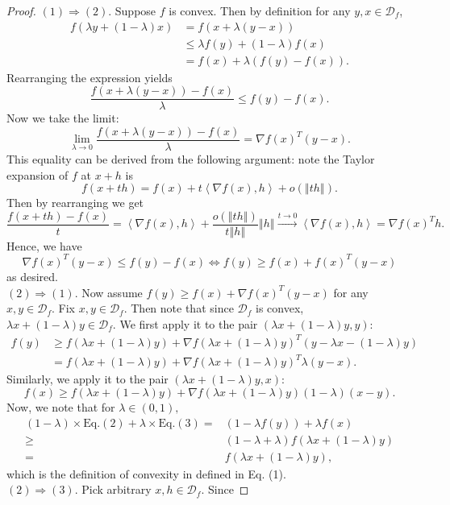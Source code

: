 \begin{proof}
$(1)\Rightarrow(2).$ Suppose $f$ is convex. Then by definition for
any $y,x\in\mathcal{D}_{f}$, 
\begin{align*}
f(\lambda y+(1-\lambda)x) & =f(x+\lambda(y-x))\\
 & \leq\lambda f(y)+(1-\lambda)f(x)\\
 & =f(x)+\lambda(f(y)-f(x)).
\end{align*}
Rearranging the expression yields 
\[
\frac{f(x+\lambda(y-x))-f(x)}{\lambda}\leq f(y)-f(x).
\]
Now we take the limit: 
\[
\lim_{\lambda\rightarrow0}\frac{f(x+\lambda(y-x))-f(x)}{\lambda}=\nabla f(x)^{T}(y-x).
\]
This equality can be derived from the following argument: note the
Taylor expansion of $f$ at $x+h$ is 
\[
f(x+th)=f(x)+t\left\langle \nabla f(x),h\right\rangle +o(\left\Vert th\right\Vert ).
\]
Then by rearranging we get 
\[
\frac{f(x+th)-f(x)}{t}=\left\langle \nabla f(x),h\right\rangle +\frac{o(\left\Vert th\right\Vert )}{t\left\Vert h\right\Vert }\left\Vert h\right\Vert \xrightarrow{t\rightarrow0}\left\langle \nabla f(x),h\right\rangle =\nabla f(x)^{T}h.
\]
Hence, we have 
\[
\nabla f(x)^{T}(y-x)\leq f(y)-f(x)\iff f(y)\geq f(x)+f(x)^{T}(y-x)
\]
as desired. \medskip\\
$(2)\Rightarrow(1)$. Now assume $f(y)\geq f(x)+\nabla f(x)^{T}(y-x)$
for any $x,y\in\mathcal{D}_{f}.$ Fix $x,y\in\mathcal{D}_{f}$. Then
note that since $\mathcal{D}_{f}$ is convex, $\lambda x+(1-\lambda)y\in\mathcal{D}_{f}$.
We first apply it to the pair $(\lambda x+(1-\lambda)y,y)$: 
\begin{align*}
f(y) & \geq f(\lambda x+(1-\lambda)y)+\nabla f(\lambda x+(1-\lambda)y)^{T}(y-\lambda x-(1-\lambda)y)\\
 & =f(\lambda x+(1-\lambda)y)+\nabla f(\lambda x+(1-\lambda)y)^{T}\lambda(y-x).\tag{2}
\end{align*}
Similarly, we apply it to the pair $(\lambda x+(1-\lambda)y,x):$
\[
f(x)\geq f(\lambda x+(1-\lambda)y)+\nabla f(\lambda x+(1-\lambda)y)(1-\lambda)(x-y).\tag{3}
\]
Now, we note that for $\lambda\in(0,1),$ 
\begin{align*}
(1-\lambda)\times\text{Eq.}(2)+\lambda\times\text{Eq.}(3)= & (1-\lambda f(y))+\lambda f(x)\\
\geq & (1-\lambda+\lambda)f(\lambda x+(1-\lambda)y)\\
= & f(\lambda x+(1-\lambda)y),
\end{align*}
which is the definition of convexity in defined in Eq. (1). \medskip\\
$(2)\Rightarrow(3).$ Pick arbitrary $x,h\in\mathcal{D}_{f}$. Since

\end{proof}
